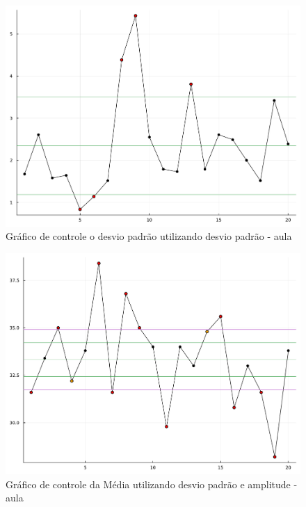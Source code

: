\documentclass[
  letterpaper,
  DIV=11,
  numbers=noendperiod]{scrartcl}
\begin{document}
\begin{figure}

{\centering \includegraphics{trabalho1_files/figure-pdf/fig9-output-1.pdf}

}

\caption{Gráfico de controle o desvio padrão utilizando desvio padrão -
aula}

\end{figure}

\begin{figure}

{\centering \includegraphics{trabalho1_files/figure-pdf/fig10-output-1.pdf}

}

\caption{Gráfico de controle da Média utilizando desvio padrão e
amplitude - aula}

\end{figure}
\end{document}
